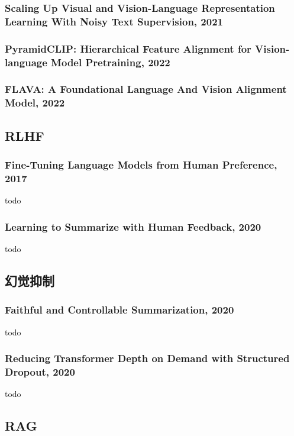 \documentclass[twocolumn, 10pt]{article} %
\begin{document}
\subsubsection{Scaling Up Visual and Vision-Language Representation Learning With Noisy Text Supervision, 2021}

\subsubsection{PyramidCLIP: Hierarchical Feature Alignment for Vision-language Model Pretraining, 2022}


\subsubsection{FLAVA: A Foundational Language And Vision Alignment Model, 2022}











\subsection{RLHF}
\subsubsection{Fine-Tuning Language Models from Human Preference, 2017}
todo


\subsubsection{Learning to Summarize with Human Feedback, 2020}
todo


\subsection{幻觉抑制}
\subsubsection{Faithful and Controllable Summarization, 2020}
todo

\subsubsection{Reducing Transformer Depth on Demand with Structured Dropout, 2020}
todo


\subsection{RAG}
\end{document}
